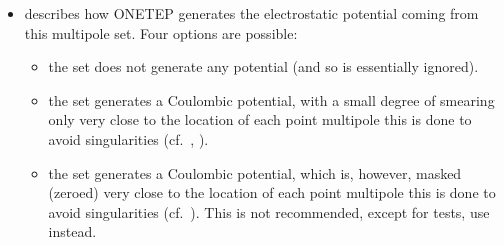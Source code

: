 \documentclass[letterpaper,10pt,english]{sphinxmanual}
\begin{document}
\begin{itemize}
\begin{itemize}
\end{itemize}

\item {} 
 \textendash{} describes how ONETEP generates the electrostatic
potential coming from this multipole set. Four options are possible:
\begin{itemize}
\item {} 
 \textendash{} the set does not generate any potential (and
so is essentially ignored).

\item {} 
 \textendash{} the set generates a Coulombic
potential, with a small degree of smearing only very close to the
location of each point multipole \textendash{} this is done to avoid
singularities (cf. ,
).

\item {} 
 \textendash{} the set generates a Coulombic
potential, which is, however, masked (zeroed) very close to the
location of each point multipole \textendash{} this is done to avoid
singularities (cf. ). This is
not recommended, except for tests, use
 instead.


\end{itemize}
\end{itemize}
\end{document}
